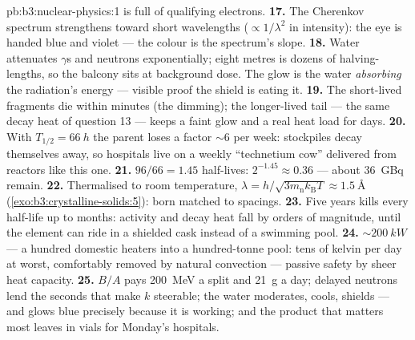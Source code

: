 \begin{solution}{pb:b3:nuclear-physics:1}
is full of qualifying electrons.
\textbf{17.} The Cherenkov spectrum strengthens toward short
wavelengths ($\propto1/\lambda^2$ in intensity): the eye is
handed blue and violet --- the colour is the spectrum's slope.
\textbf{18.} Water attenuates $\gamma$s and neutrons
exponentially; eight metres is dozens of halving-lengths, so
the balcony sits at background dose. The glow is the water
\emph{absorbing} the radiation's energy --- visible proof the
shield is eating it.
\textbf{19.} The short-lived fragments die within minutes
(the dimming); the longer-lived tail --- the same decay heat of
question 13 --- keeps a faint glow and a real heat load for
days.
\textbf{20.} With $T_{1/2} = \qty{66}{h}$ the parent loses a
factor ${\sim}6$ per week: stockpiles decay themselves away,
so hospitals live on a weekly ``technetium cow'' delivered from
reactors like this one.
\textbf{21.} $96/66 = 1.45$ half-lives: $2^{-1.45} \approx
0.36$ --- about \qty{36}{GBq} remain.
\textbf{22.} Thermalised to room temperature, $\lambda =
h/\sqrt{3m_{\text{n}}k_{\text{B}}T} \approx \qty{1.5}{\angstrom}$
(\cref{exo:b3:crystalline-solids:5}): born matched to 
spacings.
\textbf{23.} Five years kills every half-life up to months:
activity and decay heat fall by orders of magnitude, until the
element can ride in a shielded cask instead of a swimming pool.
\textbf{24.} ${\sim}\qty{200}{kW}$ --- a hundred domestic
heaters into a hundred-tonne pool: tens of kelvin per day at
worst, comfortably removed by natural convection --- passive
safety by sheer heat capacity.
\textbf{25.} $B/A$ pays \qty{200}{MeV} a split and \qty{21}{g}
a day; delayed neutrons lend the seconds that make $k$
steerable; the water moderates, cools, shields --- and glows
blue precisely because it is working; and the product that
matters most leaves in vials for Monday's hospitals.
\end{solution}
